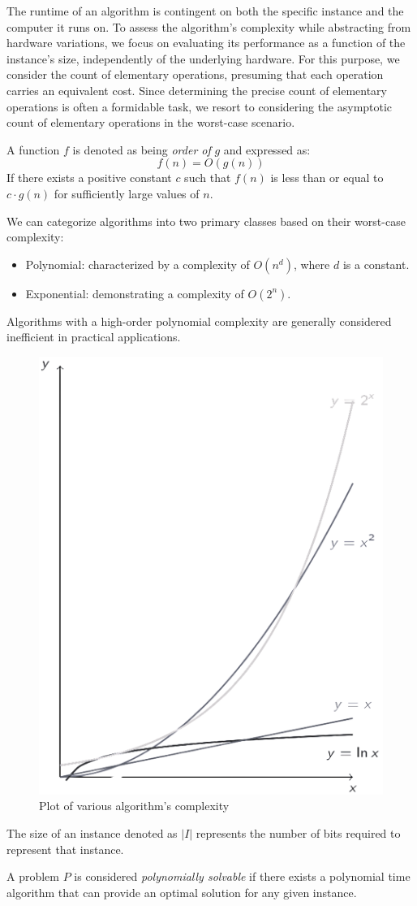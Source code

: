 \documentclass[12pt, a4paper]{report}
\begin{document}
    The runtime of an algorithm is contingent on both the specific instance and the computer it runs on. 
    To assess the algorithm's complexity while abstracting from hardware variations, we focus on evaluating its performance as a function of the instance's size, independently of the underlying hardware. 
    For this purpose, we consider the count of elementary operations, presuming that each operation carries an equivalent cost. 
    Since determining the precise count of elementary operations is often a formidable task, we resort to considering the asymptotic count of elementary operations in the worst-case scenario.
    \begin{definition}
        A function $f$ is denoted as being \emph{order of} $g$ and expressed as:
        \[f(n)=O(g(n))\]
        If there exists a positive constant $c$ such that $f(n)$ is less than or equal to $c \cdot g(n)$ for sufficiently large values of $n$.
    \end{definition}
    We can categorize algorithms into two primary classes based on their worst-case complexity:
    \begin{itemize}
        \item Polynomial: characterized by a complexity of $O(n^d)$, where $d$ is a constant.
        \item Exponential: demonstrating a complexity of $O(2^n)$. 
    \end{itemize}
    Algorithms with a high-order polynomial complexity are generally considered inefficient in practical applications.
    \begin{figure}[H]
        \centering
        \includegraphics[width=0.25\linewidth]{images/complexity.png}
        \caption{Plot of various algorithm's complexity}
    \end{figure}
    \begin{definition}
        The size of an instance denoted as $\left\lvert I \right\rvert$ represents the number of bits required to represent that instance.

        A problem $P$ is considered \emph{polynomially solvable} if there exists a polynomial time algorithm that can provide an optimal solution for any given instance.
    \end{definition}
\end{document}
